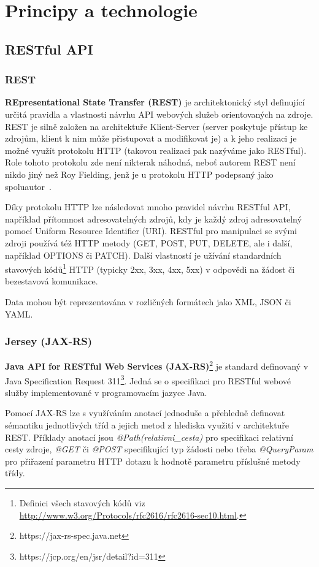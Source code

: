 \documentclass[thesis=M,czech]{FITthesis}[2014/05/07]
\begin{document}
\section{Principy a technologie}
\label{sec:sysanalys}

\subsection{RESTful API}
\label{rest}
\subsubsection{REST}
\textbf{REpresentational State Transfer (REST)} je architektonický styl definující určitá pravidla a vlastnosti návrhu API webových služeb orientovaných na zdroje. REST je silně založen na architektuře Klient-Server (server poskytuje přístup ke zdrojům, klient k nim může přistupovat a modifikovat je) a k jeho realizaci je možné využít protokolu HTTP (takovou realizaci pak nazýváme jako RESTful). Role tohoto protokolu zde není nikterak náhodná, neboť autorem REST není nikdo jiný než Roy Fielding, jenž je u protokolu HTTP podepsaný jako spoluautor~\cite{Fielding:2000:ASD:932295}. 

Díky protokolu HTTP lze následovat mnoho pravidel návrhu RESTful API, například přítomnost adresovatelných zdrojů, kdy je každý zdroj adresovatelný pomocí Uniform Resource Identifier (URI). RESTful pro manipulaci se svými zdroji používá též HTTP metody (GET, POST, PUT, DELETE, ale i další, například OPTIONS či PATCH). Další vlastností je užívání standardních stavových kódů\footnote{Definici všech stavových kódů viz \url{http://www.w3.org/Protocols/rfc2616/rfc2616-sec10.html}.} HTTP (typicky 2xx, 3xx, 4xx, 5xx) v odpovědi na žádost či bezestavová komunikace.

Data mohou být reprezentována v rozličných formátech jako XML, JSON či YAML.

\subsubsection{Jersey (JAX-RS)}
\textbf{Java API for RESTful Web Services (JAX-RS)}\footnote{https://jax-rs-spec.java.net} je standard definovaný v Java Specification Request 311\footnote{https://jcp.org/en/jsr/detail?id=311}. Jedná se o specifikaci pro RESTful webové služby implementované v programovacím jazyce Java.

Pomocí JAX-RS lze s využíváním anotací jednoduše a přehledně definovat sémantiku jednotlivých tříd a jejich metod z hlediska využití v architektuře REST. Příklady anotací jsou \emph{@Path(relativni\_cesta)} pro specifikaci relativní cesty zdroje, \emph{@GET} či \emph{@POST} specifikující typ žádosti nebo třeba \emph{@QueryParam} pro přiřazení parametru HTTP dotazu k hodnotě parametru příslušné metody třídy.
\end{document}
